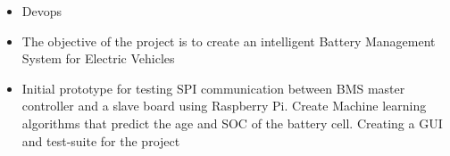 \documentclass[10pt,a4paper,ragged2e,withhyper]{altacv}
\begin{document}
\begin{paracol}{2}
\begin{itemize}
 \item    Devops
    \linebreak

    \end{itemize}




\medskip


{}








\end{paracol}

\newpage




\begin{itemize}
\item The objective of the project is to create an intelligent Battery Management System for Electric Vehicles
    \item Initial prototype for testing SPI communication between BMS master controller and a slave board using Raspberry Pi. Create Machine learning algorithms that predict the age and SOC of the battery cell. Creating a GUI and test-suite for the project
\end{itemize}
\divider
\end{document}
